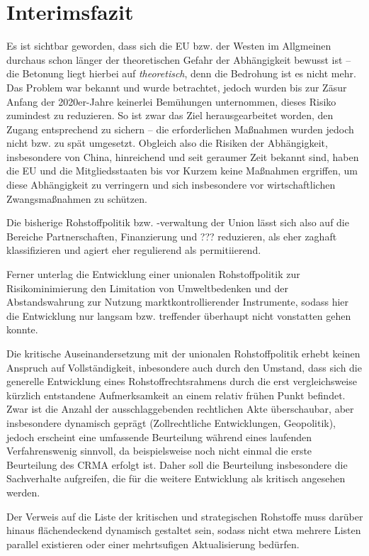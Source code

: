 \documentclass[12pt,a4paper,oneside]{book} %
\begin{document}
\section{Interimsfazit}
Es ist sichtbar geworden, dass sich die EU bzw. der Westen im Allgmeinen durchaus schon länger der theoretischen Gefahr der Abhängigkeit bewusst ist -- die Betonung liegt hierbei auf \textit{theoretisch}, denn die Bedrohung ist es nicht mehr. Das Problem war bekannt und wurde betrachtet, jedoch wurden bis zur Zäsur Anfang der 2020er-Jahre keinerlei Bemühungen unternommen, dieses Risiko zumindest zu reduzieren. So ist zwar das Ziel herausgearbeitet worden, den Zugang entsprechend zu sichern -- die erforderlichen Maßnahmen wurden jedoch nicht bzw. zu spät umgesetzt. Obgleich also die Risiken der Abhängigkeit, insbesondere von China, hinreichend und seit geraumer Zeit bekannt sind, haben die EU und die Mitgliedsstaaten bis vor Kurzem keine Maßnahmen ergriffen, um diese Abhängigkeit zu verringern und sich insbesondere vor wirtschaftlichen Zwangsmaßnahmen zu schützen.

Die bisherige Rohstoffpolitik bzw. -verwaltung der Union lässt sich also auf die Bereiche Partnerschaften, Finanzierung und ??? reduzieren, als eher zaghaft klassifizieren und agiert eher regulierend als permitiierend.

Ferner unterlag die Entwicklung einer unionalen Rohstoffpolitik zur Risikominimierung den Limitation von Umweltbedenken und der Abstandswahrung zur Nutzung marktkontrollierender Instrumente, sodass hier die Entwicklung nur langsam bzw. treffender überhaupt nicht vonstatten gehen konnte.

Die kritische Auseinandersetzung mit der unionalen Rohstoffpolitik erhebt keinen Anspruch auf Vollständigkeit, inbesondere auch durch den Umstand, dass sich die generelle Entwicklung eines Rohstoffrechtsrahmens durch die erst vergleichsweise kürzlich entstandene Aufmerksamkeit an einem relativ frühen Punkt befindet. Zwar ist die Anzahl der ausschlaggebenden rechtlichen Akte überschaubar, aber insbesondere dynamisch geprägt (Zollrechtliche Entwicklungen, Geopolitik), jedoch erscheint eine umfassende Beurteilung während eines \glqq laufenden Verfahrens\grqq wenig sinnvoll, da beispielsweise noch nicht einmal die erste Beurteilung des CRMA erfolgt ist. Daher soll die Beurteilung insbesondere die Sachverhalte aufgreifen, die für die weitere Entwicklung als kritisch angesehen werden.

Der Verweis auf die Liste der kritischen und strategischen Rohstoffe muss darüber hinaus flächendeckend dynamisch gestaltet sein, sodass nicht etwa mehrere Listen parallel existieren oder einer mehrtsufigen Aktualisierung bedürfen. 
\end{document}
